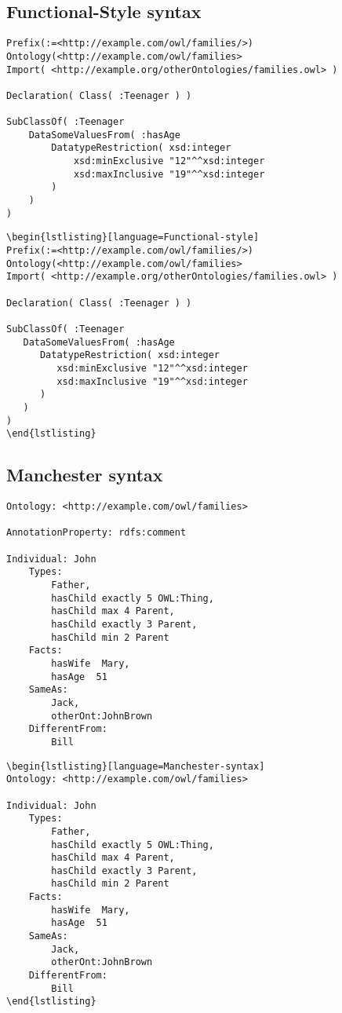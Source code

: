 \documentclass[11pt,a4paper,final,oneside,onecolumn]{article}
\begin{document}
	\subsection{Functional-Style syntax}
\begin{lstlisting}[language=Functional-style]
Prefix(:=<http://example.com/owl/families/>)
Ontology(<http://example.com/owl/families>
Import( <http://example.org/otherOntologies/families.owl> )

Declaration( Class( :Teenager ) )

SubClassOf( :Teenager
	DataSomeValuesFrom( :hasAge
		DatatypeRestriction( xsd:integer
			xsd:minExclusive "12"^^xsd:integer
			xsd:maxInclusive "19"^^xsd:integer
		)
	)
)
\end{lstlisting}

\begin{verbatim}
\begin{lstlisting}[language=Functional-style]
Prefix(:=<http://example.com/owl/families/>)
Ontology(<http://example.com/owl/families>
Import( <http://example.org/otherOntologies/families.owl> )

Declaration( Class( :Teenager ) )

SubClassOf( :Teenager
   DataSomeValuesFrom( :hasAge
      DatatypeRestriction( xsd:integer
         xsd:minExclusive "12"^^xsd:integer
         xsd:maxInclusive "19"^^xsd:integer
      )
   )
)
\end{lstlisting}
\end{verbatim}	
	
	\subsection{Manchester syntax}
\begin{lstlisting}[language=Manchester-syntax]
Ontology: <http://example.com/owl/families>

AnnotationProperty: rdfs:comment

Individual: John
    Types: 
        Father,
        hasChild exactly 5 OWL:Thing,
        hasChild max 4 Parent,
        hasChild exactly 3 Parent,
        hasChild min 2 Parent
    Facts:  
        hasWife  Mary,
        hasAge  51
    SameAs: 
        Jack,
        otherOnt:JohnBrown
    DifferentFrom: 
        Bill
\end{lstlisting}

\begin{verbatim}
\begin{lstlisting}[language=Manchester-syntax]
Ontology: <http://example.com/owl/families>

Individual: John
    Types: 
        Father,
        hasChild exactly 5 OWL:Thing,
        hasChild max 4 Parent,
        hasChild exactly 3 Parent,
        hasChild min 2 Parent
    Facts:  
        hasWife  Mary,
        hasAge  51
    SameAs: 
        Jack,
        otherOnt:JohnBrown
    DifferentFrom: 
        Bill
\end{lstlisting}
\end{verbatim}		
	
\end{document}

